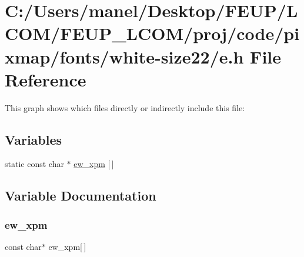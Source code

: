 \hypertarget{white-size22_2e_8h}{}\section{C\+:/\+Users/manel/\+Desktop/\+F\+E\+U\+P/\+L\+C\+O\+M/\+F\+E\+U\+P\+\_\+\+L\+C\+O\+M/proj/code/pixmap/fonts/white-\/size22/e.h File Reference}
\label{white-size22_2e_8h}
This graph shows which files directly or indirectly include this file\+:
\subsection*{Variables}
\begin{DoxyCompactItemize}
\item 
static const char $\ast$ \mbox{\hyperlink{white-size22_2e_8h_a243dbb1fba4e303f02042328ff544231}{ew\+\_\+xpm}} \mbox{[}$\,$\mbox{]}
\end{DoxyCompactItemize}


\subsection{Variable Documentation}
\mbox{\label{white-size22_2e_8h_a243dbb1fba4e303f02042328ff544231}} 
\subsubsection{\texorpdfstring{ew\_xpm}{ew\_xpm}}
{\footnotesize\ttfamily const char$\ast$ ew\+\_\+xpm\mbox{[}$\,$\mbox{]}\hspace{0.3cm}{\ttfamily [static]}}


